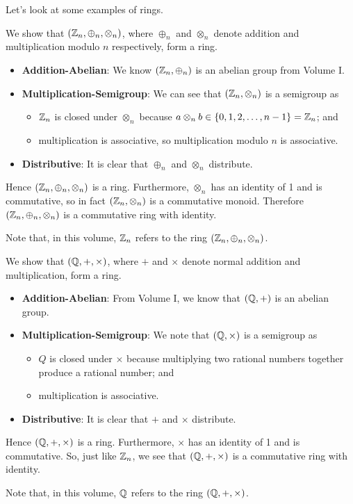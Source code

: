 Let's look at some examples of rings.
\begin{example}
    We show that $(\mathbb{Z}_{n}, \oplus_n, \otimes_n)$, where $\oplus_n$ and $\otimes_n$ denote addition and multiplication modulo $n$ respectively, form a ring.
    \begin{itemize}
        \item \textbf{Addition-Abelian}: We know $(\mathbb{Z}_{n}, \oplus_n)$ is an abelian group from Volume I.
        \item \textbf{Multiplication-Semigroup}: We can see that $(\mathbb{Z}_{n}, \otimes_n)$ is a semigroup as
        \begin{itemize}
            \item $\mathbb{Z}_{n}$ is closed under $\otimes_n$ because $a \otimes_n b \in \{0, 1, 2, \dots, n-1\} = \mathbb{Z}_{n}$; and
            \item multiplication is associative, so multiplication modulo $n$ is associative.
        \end{itemize}
        \item \textbf{Distributive}: It is clear that $\oplus_n$ and $\otimes_n$ distribute.
    \end{itemize}
    Hence $(\mathbb{Z}_{n}, \oplus_n, \otimes_n)$ is a ring. Furthermore, $\otimes_n$ has an identity of 1 and is commutative, so in fact $(\mathbb{Z}_{n}, \otimes_n)$ is a commutative monoid. Therefore $(\mathbb{Z}_{n}, \oplus_n, \otimes_n)$ is a commutative ring with identity.

    Note that, in this volume, $\mathbb{Z}_{n}$ refers to the ring $(\mathbb{Z}_{n}, \oplus_n, \otimes_n)$.
\end{example}

\begin{example}
    We show that $(\mathbb{Q}, +, \times)$, where $+$ and $\times$ denote normal addition and multiplication, form a ring.
    \begin{itemize}
        \item \textbf{Addition-Abelian}: From Volume I, we know that $(\mathbb{Q}, +)$ is an abelian group.
        \item \textbf{Multiplication-Semigroup}: We note that $(\mathbb{Q}, \times)$ is a semigroup as
        \begin{itemize}
            \item $Q$ is closed under $\times$ because multiplying two rational numbers together produce a rational number; and
            \item multiplication is associative.
        \end{itemize}
        \item \textbf{Distributive}: It is clear that $+$ and $\times$ distribute.
    \end{itemize}
    Hence $(\mathbb{Q}, +, \times)$ is a ring. Furthermore, $\times$ has an identity of 1 and is commutative. So, just like $\mathbb{Z}_{n}$, we see that $(\mathbb{Q}, +, \times)$ is a commutative ring with identity.

    Note that, in this volume, $\mathbb{Q}$ refers to the ring $(\mathbb{Q}, +, \times)$.
\end{example}

